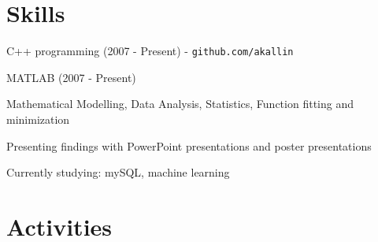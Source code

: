 \documentclass[letterpaper]{article}
\renewenvironment{itemize}{
  \begin{list}{}{
    \setlength{\leftmargin}{1.5em}
  }
}{
  \end{list}
}
\begin{document}
\section*{Skills}

\begin{itemize}
\item C++ programming (2007 - Present) - {\tt github.com/akallin} 
\item MATLAB (2007 - Present)
\item Mathematical Modelling, Data Analysis,  Statistics, Function fitting and minimization
\item Presenting findings with PowerPoint presentations and poster presentations
\item Currently studying: mySQL, machine learning
\end{itemize}

\section*{Activities}
\end{document}
